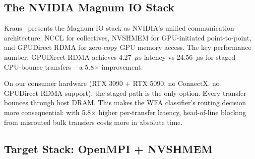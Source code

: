 \documentclass[11pt,letterpaper]{article}
\begin{document}
\begin{table}[ht]
\centering\small
{}
\caption{Transport stack comparison for distributed LLM inference. SoftRoCE support matters because our testbed uses the AQC107 10GbE NIC.}
\label{tab:transport_comparison}
\end{table}

\subsection{The NVIDIA Magnum IO Stack}

Kraus~\cite{kraus2022multinode} presents the Magnum IO stack as NVIDIA's unified communication architecture: NCCL for collectives, NVSHMEM for GPU-initiated point-to-point, and GPUDirect RDMA for zero-copy GPU memory access. The key performance number: GPUDirect RDMA achieves 4.27~$\mu$s latency vs 24.56~$\mu$s for staged CPU-bounce transfers -- a 5.8$\times$ improvement.

On our consumer hardware (RTX 3090 + RTX 5090, no ConnectX, no GPUDirect RDMA support), the staged path is the only option. Every transfer bounces through host DRAM. This makes the WFA classifier's routing decision more consequential: with 5.8$\times$ higher per-transfer latency, head-of-line blocking from misrouted bulk transfers costs more in absolute time.

\subsection{Target Stack: OpenMPI + NVSHMEM}
\end{document}
